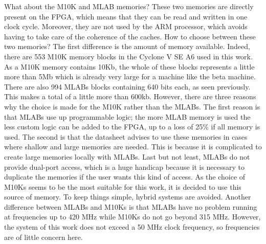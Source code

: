 What about the M10K and MLAB memories? These two memories are directly present on the FPGA, which
 means that they can be read and written in one clock cycle. Moreover, they are not used by the 
 ARM processor, which avoids having to take care of the coherence of the caches. How to choose 
 between these two memories? The first difference is the amount of memory available. Indeed, there
 are 553 M10K memory blocks in the Cyclone V SE A6
 used in this work. As a M10K memory 
 contains 10Kb, the whole of these blocks represents a little more than 5Mb which is already very 
 large for a machine like the beta machine. There are also 994 MLABs blocks containing 640 bits each, 
 as seen previously. This makes a total of a little more than 600kb. 
 However, there are three reasons why the choice is made for the M10K rather than the MLABs. 
 The first reason is that MLABs use up programmable logic; the more MLAB memory is used the less 
 custom logic can be added to the FPGA, up to a loss of 25\% if all memory is used. The second is 
 that the datasheet advises to use these memories in cases where shallow and large memories are 
 needed. This is because it is complicated to create large memories locally with MLABs. Last 
 but not least, MLABs do not provide dual-port access, which is a huge handicap because it is 
 necessary to duplicate the memories if the user wants this kind of access. As the choice of M10Ks 
 seems to be the most suitable for this work, it is decided to use this source of memory.  To keep things simple, 
 hybrid systems are avoided.  Another difference between MLABs and M10Ks is that 
 MLABs have no problem running at frequencies up to 420 MHz while M10Ks do not go beyond 315 MHz. 
 However, the system of this work does not exceed a 50 MHz clock frequency, so frequencies are of little concern here.
